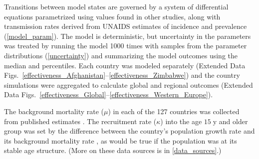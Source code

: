 \documentclass{article}
\begin{document}
Transitions between model states are governed by a system of
differential equations parametrized using values found in other
studies, along with transmission rates derived from UNAIDS estimates
of incidence and prevalence (\autoref{model_param}).  The model is
deterministic, but uncertainty in the parameters was treated by
running the model 1000 times with samples from the parameter
distributions (\autoref{uncertainty}) and summarizing the model
outcomes using the median and percentiles.  Each country was modeled
separately (Extended Data
Figs.~\ref*{effectiveness_Afghanistan}--\ref*{effectiveness_Zimbabwe})
and the country simulations were aggregated to calculate global and
regional outcomes (Extended Data
Figs.~\ref*{effectiveness_Global}--\ref*{effectiveness_Western_Europe}).

The background mortality rate ($\mu$) in each of the 127 countries was
collected from published estimates
\autocite{World_Development_Indicators2013-ee}.  The recruitment rate
($\kappa$) into the age $15\;\text{y}$ and older group was set by the
difference between the country's population growth rate
\autocite{WorldBankpg} and its background mortality rate
\autocite{World_Development_Indicators2013-ee}, as would be true if
the population was at its stable age structure.  (More on these data
sources is in \autoref{data_sources}.)
\end{document}

